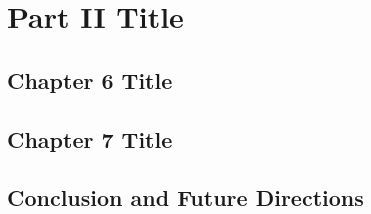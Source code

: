 \documentclass[12pt,a4paper,openright,notitlepage]{extreport}
\begin{document}
\part{Part II Title}
\thispagestyle{empty}
\newpage
\blankpagewithnumber
\lhead{\fancyplain{}{}} %

\newpage
\blankpagewithnumber
\lhead{\fancyplain{}{\chaptername~ \thechapter}}

\chapter{Chapter 6 Title}
\label{chap:chapter_6}


\chapter{Chapter 7 Title}
\label{chap:chapter_7}



\chapter{Conclusion and Future Directions}
\label{chap:chapter_8}



\appendix
\appendixpage
\noappendicestocpagenum
\addappheadtotoc

\rhead{\fancyplain{}{}}
\makeatletter
\renewcommand{\thesection}{\@arabic\c@section}
\makeatother

\newpage
\blankpage
\end{document}
